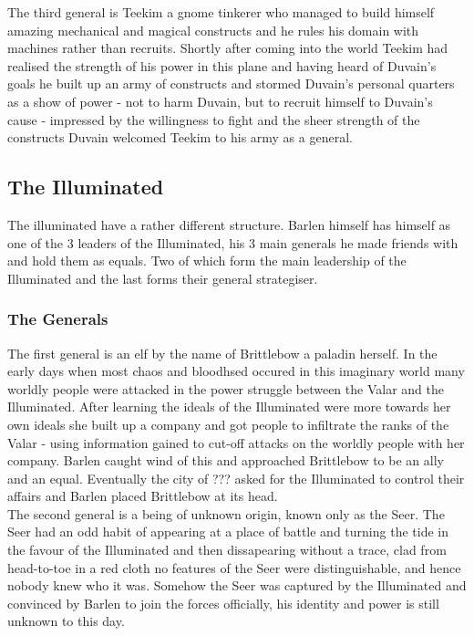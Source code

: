 \documentclass[10pt,twoside,twocolumn]{article}
\begin{document}
The third general is Teekim a gnome tinkerer who managed to build himself amazing mechanical and magical constructs and he rules his domain with machines rather than recruits. Shortly after coming into the world Teekim had realised the strength of his power in this plane and having heard of Duvain's goals he built up an army of constructs and stormed Duvain's personal quarters as a show of power - not to harm Duvain, but to recruit himself to Duvain's cause - impressed by the willingness to fight and the sheer strength of the constructs Duvain welcomed Teekim to his army as a general.\\

\subsection{The Illuminated}
The illuminated have a rather different structure. Barlen himself has himself as one of the 3 leaders of the Illuminated, his 3 main generals he made friends with and hold them as equals. Two of which form the main leadership of the Illuminated and the last forms their general strategiser.\\

\subsubsection{The Generals}
The first general is an elf by the name of Brittlebow a paladin herself. In the early days when most chaos and bloodhsed occured in this imaginary world many worldly people were attacked in the power struggle between the Valar and the Illuminated. After learning the ideals of the Illuminated were more towards her own ideals she built up a company and got people to infiltrate the ranks of the Valar - using information gained to cut-off attacks on the worldly people with her company. Barlen caught wind of this and approached Brittlebow to be an ally and an equal. Eventually the city of ??? asked for the Illuminated to control their affairs and Barlen placed Brittlebow at its head.\\

The second general is a being of unknown origin, known only as the Seer. The Seer had an odd habit of appearing at a place of battle and turning the tide in the favour of the Illuminated and then dissapearing without a trace, clad from head-to-toe in a red cloth no features of the Seer were distinguishable, and hence nobody knew who it was. Somehow the Seer was captured by the Illuminated and convinced by Barlen to join the forces officially, his identity and power is still unknown to this day.\\
\end{document}
